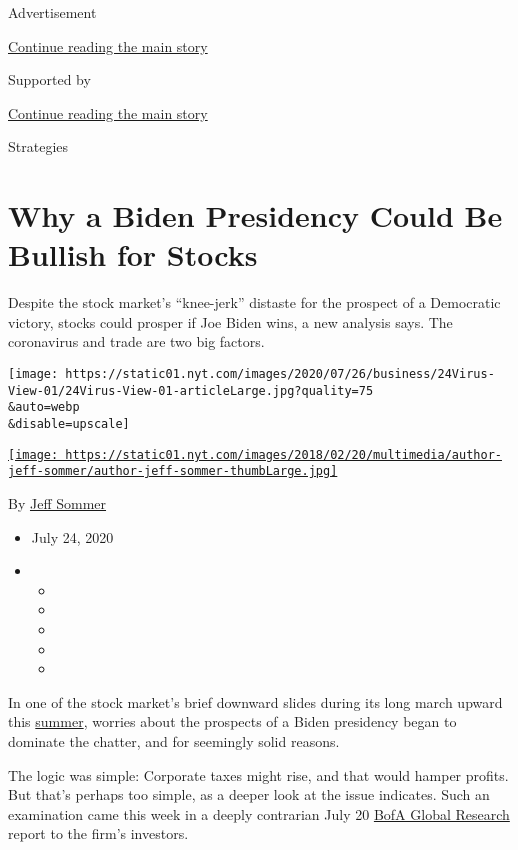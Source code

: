Advertisement

\protect\hyperlink{after-top}{Continue reading the main story}

Supported by

\protect\hyperlink{after-sponsor}{Continue reading the main story}

Strategies

\hypertarget{why-a-biden-presidency-could-be-bullish-for-stocks}{%
\section{Why a Biden Presidency Could Be Bullish for
Stocks}\label{why-a-biden-presidency-could-be-bullish-for-stocks}}

Despite the stock market's ``knee-jerk'' distaste for the prospect of a
Democratic victory, stocks could prosper if Joe Biden wins, a new
analysis says. The coronavirus and trade are two big factors.

\texttt{[image: https://static01.nyt.com/images/2020/07/26/business/24Virus-View-01/24Virus-View-01-articleLarge.jpg?quality=75\\\&auto=webp\\\&disable=upscale]}

\href{https://www.nytimes.com/by/jeff-sommer}{\texttt{[image: https://static01.nyt.com/images/2018/02/20/multimedia/author-jeff-sommer/author-jeff-sommer-thumbLarge.jpg]}}

By \href{https://www.nytimes.com/by/jeff-sommer}{Jeff Sommer}

\begin{itemize}
\item
  July 24, 2020
\item
  \begin{itemize}
  \item
  \item
  \item
  \item
  \item
  \end{itemize}
\end{itemize}

In one of the stock market's brief downward slides during its long march
upward this
\href{https://www.nytimes.com/2020/07/07/business/wall-street-joe-biden.html}{summer},
worries about the prospects of a Biden presidency began to dominate the
chatter, and for seemingly solid reasons.

The logic was simple: Corporate taxes might rise, and that would hamper
profits. But that's perhaps too simple, as a deeper look at the issue
indicates. Such an examination came this week in a deeply contrarian
July 20
\href{https://www.bofaml.com/en-us/content/market-strategies-insights.html?cm_mmc=GCB-Integrated-_-Google-PS-_-bofa_global_research-_-Brand_General\&gclid=Cj0KCQjwjer4BRCZARIsABK4QeU5ptDZuvjxVvf9x6D3VXH0kNxfFUZPOhTy-730690mmsz2N8xezkwaAjguEALw_wcB\&gclsrc=aw.ds}{BofA
Global Research} report to the firm's investors.

